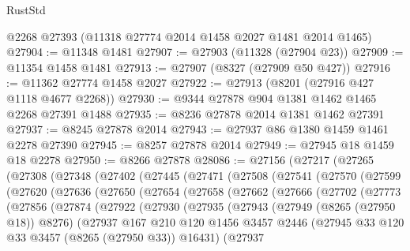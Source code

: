 \begin{lexlean}{RustStd}
\begin{coremodule}
    @2268
    @27393
    (@11318 @27774 @2014 @1458 @2027 @1481 @2014 @1465)
@27904 := @11348 @1481
@27907 := @27903 (@11328 (@27904 @23))
@27909 := @11354 @1458 @1481
@27913 := @27907 (@8327 (@27909 @50 @427))
@27916 := @11362 @27774 @1458 @2027
@27922 := @27913 (@8201 (@27916 @427 @1118 @4677 @2268))
@27930 := @9344 @27878 @904 @1381 @1462 @1465 @2268 @27391 @1488
@27935 := @8236 @27878 @2014 @1381 @1462 @27391
@27937 := @8245 @27878 @2014
@27943 := @27937 @86 @1380 @1459 @1461 @2278 @27390
@27945 := @8257 @27878 @2014
@27949 := @27945 @18 @1459 @18 @2278
@27950 := @8266 @27878
@28086 := @27156
    (@27217
      (@27265
        (@27308
          (@27348
            (@27402
              (@27445
                (@27471
                  (@27508
                    (@27541
                      (@27570
                        (@27599
                          (@27620
                            (@27636
                              (@27650
                                (@27654
                                  (@27658
                                    (@27662
                                      (@27666
                                        (@27702
                                          (@27773
                                            (@27856
                                              (@27874
                                                (@27922
                                                  (@27930
                                                    (@27935
                                                      (@27943
                                                        (@27949 (@8265 (@27950 @18)) @8276)
                                                        (@27937
                                                          @167
                                                          @210
                                                          @120
                                                          @1456
                                                          @3457
                                                          @2446
                                                          (@27945
                                                            @33
                                                            @120
                                                            @33
                                                            @3457
                                                            (@8265 (@27950 @33))
                                                            @16431)
                                                          (@27937

\end{coremodule}
\end{lexlean}
